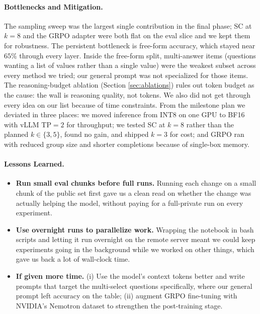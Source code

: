 \documentclass{article}
\begin{document}
\paragraph{Bottlenecks and Mitigation.}
The sampling sweep was the largest single contribution in the
final phase; SC at $k=8$ and the GRPO adapter were both flat on
the eval slice and we kept them for robustness. The persistent
bottleneck is free-form accuracy, which stayed near $65\%$
through every layer. Inside the free-form split, multi-answer
items (questions wanting a list of values rather than a single
value) were the weakest subset across every method we tried;
our general prompt was not specialized for those items. The
reasoning-budget ablation (Section \ref{sec:ablations}) rules
out token budget as the cause: the wall is reasoning quality,
not tokens. We also did not get through every idea on our list
because of time constraints. From the milestone plan we
deviated in three places: we moved inference from INT8 on one
GPU to BF16 with vLLM TP$=2$ for throughput; we tested SC at
$k=8$ rather than the planned $k\in\{3,5\}$, found no gain, and
shipped $k=3$ for cost; and GRPO ran with reduced group size
and shorter completions because of single-box memory.

\paragraph{Lessons Learned.}
\begin{itemize}
    \item \textbf{Run small eval chunks before full runs.}
    Running each change on a small chunk of the public set first
    gave us a clean read on whether the change was actually
    helping the model, without paying for a full-private run on
    every experiment.
    \item \textbf{Use overnight runs to parallelize work.}
    Wrapping the notebook in bash scripts and letting it run
    overnight on the remote server meant we could keep
    experiments going in the background while we worked on
    other things, which gave us back a lot of wall-clock time.
    \item \textbf{If given more time.} (i) Use the model's
    context tokens better and write prompts that target the
    multi-select questions specifically, where our general
    prompt left accuracy on the table; (ii) augment GRPO
    fine-tuning with NVIDIA's Nemotron dataset to strengthen the
    post-training stage.
\end{itemize}
\end{document}
